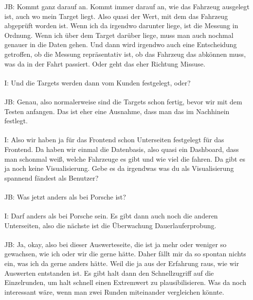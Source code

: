 \begin{linenumbers}
JB: Kommt ganz darauf an. Kommt immer darauf an, wie das Fahrzeug ausgelegt ist, auch wo mein Target liegt. Also quasi der Wert, mit dem das Fahrzeug abgeprüft worden ist. Wenn ich da irgendwo darunter liege, ist die Messung in Ordnung. Wenn ich über dem Target darüber liege, muss man auch nochmal genauer in die Daten gehen. Und dann wird irgendwo auch eine Entscheidung getroffen, ob die Messung repräsentativ ist, ob das Fahrzeug das abkönnen muss, was da in der Fahrt passiert. Oder geht das eher Richtung Missuse.\\\\
I: Und die Targets werden dann vom Kunden festgelegt, oder?\\\\
JB: Genau, also normalerweise sind die Targets schon fertig, bevor wir mit dem Testen anfangen. Das ist eher eine Ausnahme, dass man das im Nachhinein festlegt. \\\\
I: Also wir haben ja für das Frontend schon Unterseiten festgelegt für das Frontend. Da haben wir einmal die Datenbasis, also quasi ein Dashboard, dass man schonmal weiß, welche Fahrzeuge es gibt und wie viel die fahren. Da gibt es ja noch keine Visualisierung. Gebe es da irgendwas was du als Visualisierung spannend fändest als Benutzer?\\\\
JB: Was jetzt anders als bei Porsche ist?\\\\
I: Darf anders als bei Porsche sein. Es gibt dann auch noch die anderen Unterseiten, also die nächste ist die Überwachung Dauerlauferprobung.\\\\
JB: Ja, okay, also bei dieser Auswerteseite, die ist ja mehr oder weniger so gewachsen, wie ich oder wir die gerne hätte. Daher fällt mir da so spontan nichts ein, was ich da gerne anders hätte. Weil die ja aus der Erfahrung raus, wie wir Auswerten entstanden ist. Es gibt halt dann den Schnellzugriff auf die Einzelrunden, um halt schnell einen Extremwert zu plausibilisieren. Was da noch interessant wäre, wenn man zwei Runden miteinander vergleichen könnte.\\\\

\end{linenumbers}
